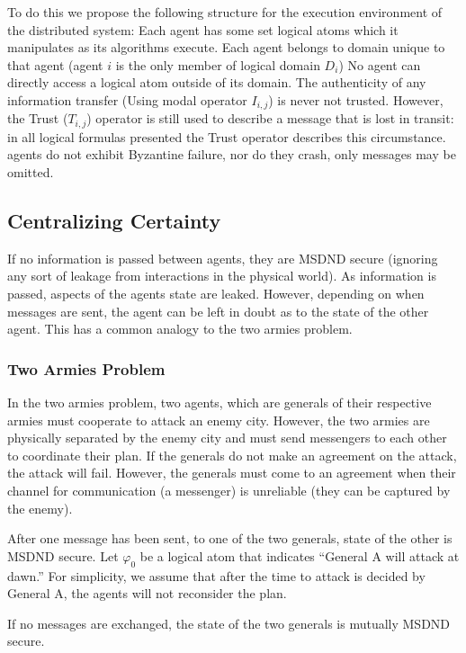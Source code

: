 To do this we propose the following structure for the execution environment of the distributed system:
Each agent has some set logical atoms which it manipulates as its algorithms execute.
Each agent belongs to domain unique to that agent (agent $i$ is the only member of logical domain $D_i$)
No agent can directly access a logical atom outside of its domain.
The authenticity of any information transfer (Using modal operator $I_{i,j}$) is never not trusted. However, the Trust ($T_{i,j}$) operator is still used to describe a message that is lost in transit: in all logical formulas presented the Trust operator describes this circumstance.
agents do not exhibit Byzantine failure, nor do they crash, only messages may be omitted.

\subsection{Centralizing Certainty}

If no information is passed between agents, they are MSDND secure (ignoring any sort of leakage from interactions in the physical world). As information is passed, aspects of the agents state are leaked. However, depending on when messages are sent, the agent can be left in doubt as to the state of the other agent. This has a common analogy to the two armies problem. 

\subsubsection{Two Armies Problem}

In the two armies problem, two agents, which are generals of their respective armies must cooperate to attack an enemy city. However, the two armies are physically separated by the enemy city and must send messengers to each other to coordinate their plan. If the generals do not make an agreement on the attack, the attack will fail. However, the generals must come to an agreement when their channel for communication (a messenger) is unreliable (they can be captured by the enemy).

After one message has been sent, to one of the two generals, state of the other is MSDND secure. Let $\varphi_0$ be a logical atom that indicates ``General A will attack at dawn.'' For simplicity, we assume that after the time to attack is decided by General A, the agents will not reconsider the plan.

\begin{thm}
If no messages are exchanged, the state of the two generals is mutually MSDND secure. \label{thm:nomsg}
\end{thm}

